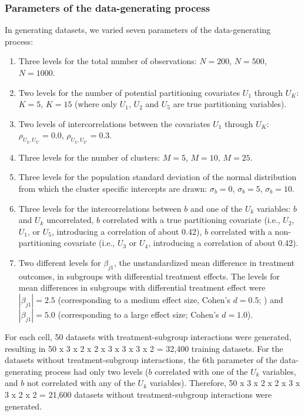 \documentclass[nobf,doc]{apa}
\begin{document}
\subsubsection{Parameters of the data-generating process}

In generating datasets, we varied seven parameters of the data-generating process:
 
\begin{enumerate} 
\item Three levels for the total number of observations: $N=200$, $N=500$, $N=1000$.
\item Two levels for the number of potential partitioning covariates $U_1$ through $U_K$: $K=5$, $K=15$ (where only $U_1$, $U_2$ and $U_5$ are true partitioning variables).
\item Two levels of intercorrelations between the covariates $U_1$ through $U_K$: $\rho_{U_{k},U_{k'}}=0.0$, $\rho_{U_{k},U_{k'}}=0.3$.
\item Three levels for the number of clusters: $M=5$, $M=10$, $M=25$.
\item Three levels for the population standard deviation of the normal distribution from which the cluster specific intercepts are drawn: $\sigma_{b}=0$, $\sigma_{b}=5$, $\sigma_{b}=10$.
\item Three levels for the intercorrelations between $b$ and one of the $U_k$ variables: $b$ and $U_k$ uncorrelated, $b$ correlated with a true partitioning covariate (i.e., $U_2$, $U_1$, or $U_5$, introducing a correlation of about 0.42), $b$ correlated with a non-partitioning covariate (i.e., $U_3$ or $U_4$, introducing a correlation of about 0.42). 
\item Two different levels for $\beta_{j1}$, the unstandardized mean difference in treatment outcomes, in subgroups with differential treatment effects. The levels for mean differences in subgroups with differential treatment effect were $|\beta_{j1}| = 2.5$ (corresponding to a medium effect size, Cohen's $d = 0.5$; ) and $|\beta_{j1}| = 5.0$ (corresponding to a large effect size; Cohen's $d = 1.0$).
\end{enumerate}

For each cell, 50 datasets with treatment-subgroup interactions were generated, resulting in 50 x 3 x 2 x 2 x 3 x 3 x 3 x 2 = 32,400 training datasets. For the datasets without treatment-subgroup interactions, the 6th parameter of the data-generating process had only two levels ($b$ correlated with one of the $U_k$ variables, and $b$ not correlated with any of the $U_k$ variables). Therefore, 50 x 3 x 2 x 2 x 3 x 3 x 2 x 2 = 21,600 datasets without treatment-subgroup interactions were generated.
\end{document}
